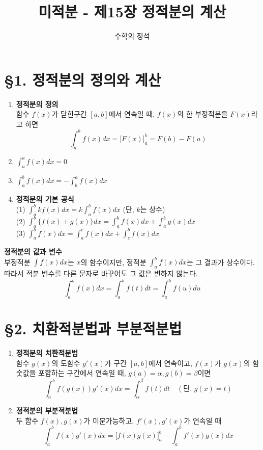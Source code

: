 \documentclass[a4paper,11pt]{article}
\title{\textbf{미적분 - 제15장 정적분의 계산}}
\author{수학의 정석}
\date{}
\begin{document}
\maketitle

\section*{§1. 정적분의 정의와 계산}

\begin{conceptbox}[기본 정석]
\begin{enumerate}
    \item \textbf{정적분의 정의}\\
    함수 $f(x)$가 닫힌구간 $[a, b]$에서 연속일 때, $f(x)$의 한 부정적분을 $F(x)$라고 하면
    \[ \int_{a}^{b} f(x) dx = \Big[ F(x) \Big]_{a}^{b} = F(b) - F(a) \]
    \item $\displaystyle\int_{a}^{a} f(x) dx = 0$
    \item $\displaystyle\int_{a}^{b} f(x) dx = -\displaystyle\int_{b}^{a} f(x) dx$
    \item \textbf{정적분의 기본 공식}\\
    (1) $\displaystyle\int_{a}^{b} k f(x) dx = k \int_{a}^{b} f(x) dx$ (단, $k$는 상수)\\
    (2) $\displaystyle\int_{a}^{b} \{f(x) \pm g(x)\} dx = \int_{a}^{b} f(x) dx \pm \int_{a}^{b} g(x) dx$\\
    (3) $\displaystyle\int_{a}^{b} f(x) dx = \int_{a}^{c} f(x) dx + \int_{c}^{b} f(x) dx$
\end{enumerate}
\end{conceptbox}



\begin{advicebox}
\textbf{정적분의 값과 변수}\\
부정적분 $\int f(x) dx$는 $x$의 함수이지만, 정적분 $\int_{a}^{b} f(x) dx$는 그 결과가 상수이다. 따라서 적분 변수를 다른 문자로 바꾸어도 그 값은 변하지 않는다.
\[ \int_{a}^{b} f(x) dx = \int_{a}^{b} f(t) dt = \int_{a}^{b} f(u) du \]
\end{advicebox}

\section*{§2. 치환적분법과 부분적분법}

\begin{conceptbox}[기본 정석]
\begin{enumerate}
    \item \textbf{정적분의 치환적분법}\\
    함수 $g(x)$의 도함수 $g'(x)$가 구간 $[a, b]$에서 연속이고, $f(x)$가 $g(x)$의 함숫값을 포함하는 구간에서 연속일 때, $g(a)=\alpha, g(b)=\beta$이면
    \[ \int_{a}^{b} f(g(x))g'(x) dx = \int_{\alpha}^{\beta} f(t) dt \quad (\text{단, } g(x)=t) \]
    \item \textbf{정적분의 부분적분법}\\
    두 함수 $f(x), g(x)$가 미분가능하고, $f'(x), g'(x)$가 연속일 때
    \[ \int_{a}^{b} f(x)g'(x) dx = \Big[ f(x)g(x) \Big]_{a}^{b} - \int_{a}^{b} f'(x)g(x) dx \]
\end{enumerate}
\end{conceptbox}
\end{document}
